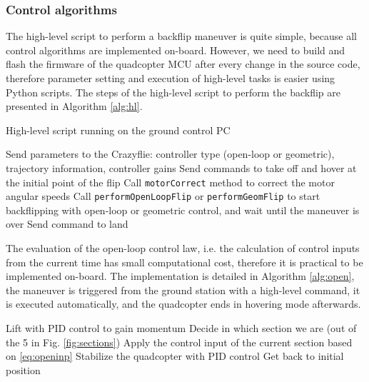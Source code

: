 \subsubsection{Control algorithms}

The high-level script to perform a backflip maneuver is quite simple, because all control algorithms are implemented on-board. However, we need to build and flash the firmware of the quadcopter MCU after every change in the source code, therefore parameter setting and execution of high-level tasks is easier using Python scripts. The steps of the high-level script to perform the backflip are presented in Algorithm \ref{alg:hl}.
\begin{algorithm}
  \caption{High-level script running on the ground control PC}
  \label{alg:hl}
  \begin{algorithmic}[1]
    \State Send parameters to the Crazyflie: controller type (open-loop or geometric), trajectory information, controller gains
    \State Send commands to take off and hover at the initial point of the flip
    \State Call \verb+motorCorrect+ method to correct the motor angular speeds
    \State Call \verb+performOpenLoopFlip+ or \verb+performGeomFlip+ to start backflipping with open-loop or geometric control, and wait until the maneuver is over
    \State Send command to land
  \end{algorithmic}
  \end{algorithm}

The evaluation of the open-loop control law, i.e. the calculation of control inputs from the current time has small computational cost, therefore it is practical to be implemented on-board. The implementation is detailed in Algorithm \ref{alg:open}, the maneuver is triggered from the ground station with a high-level command, it is executed automatically, and the quadcopter ends in hovering mode afterwards.
\begin{algorithm}
  \cprotect\caption{\verb+performOpenLoopFlip+ on-board implementation}
  \label{alg:open}
  \begin{algorithmic}[1]
    \State Lift with PID control to gain momentum
      \State Decide in which section we are (out of the 5 in Fig. \ref{fig:sections})
      \State Apply the control input of the current section based on \eqref{eq:openinp}
    \EndWhile
    \State Stabilize the quadcopter with PID control
    \State Get back to initial position
  \end{algorithmic}
  \end{algorithm}
  
